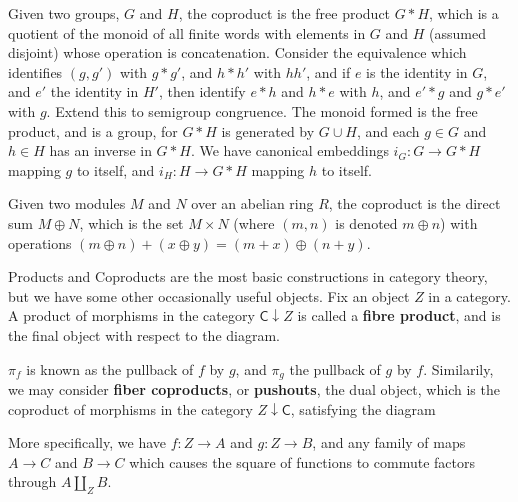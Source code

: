 \begin{example}
    Given two groups, $G$ and $H$, the coproduct is the free product $G * H$, which is a quotient of the monoid of all finite words with elements in $G$ and $H$ (assumed disjoint) whose operation is concatenation. Consider the equivalence which identifies $(g,g')$ with $g * g'$, and $h * h'$ with $hh'$, and if $e$ is the identity in $G$, and $e'$ the identity in $H'$, then identify $e * h$ and $h * e$ with $h$, and $e' * g$ and $g * e'$ with $g$. Extend this to semigroup congruence. The monoid formed is the free product, and is a group, for $G * H$ is generated by $G \cup H$, and each $g \in G$ and $h \in H$ has an inverse in $G * H$. We have canonical embeddings $i_G: G \to G * H$ mapping $g$ to itself, and $i_H: H \to G * H$ mapping $h$ to itself.
\end{example}

\begin{example}
    Given two modules $M$ and $N$ over an abelian ring $R$, the coproduct is the direct sum $M \oplus N$, which is the set $M \times N$ (where $(m,n)$ is denoted $m \oplus n$) with operations $(m \oplus n) + (x \oplus y) = (m + x) \oplus (n + y)$.
\end{example}

Products and Coproducts are the most basic constructions in category theory, but we have some other occasionally useful objects. Fix an object $Z$ in a category. A product of morphisms in the category $\mathsf{C} \downarrow Z$ is called a {\bf fibre product}, and is the final object with respect to the diagram.
%
\begin{center}
\end{center}
%
$\pi_f$ is known as the pullback of $f$ by $g$, and $\pi_g$ the pullback of $g$ by $f$. Similarily, we may consider {\bf fiber coproducts}, or {\bf pushouts}, the dual object, which is the coproduct of morphisms in the category $Z \downarrow \mathsf{C}$, satisfying the diagram
%
\begin{center}
\end{center}
%
More specifically, we have $f: Z \to A$ and $g: Z \to B$, and any family of maps $A \to C$ and $B \to C$ which causes the square of functions to commute factors through $A \coprod_Z B$.

